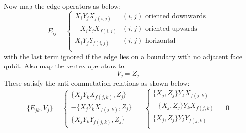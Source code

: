 \documentclass[twoside]{article}
\begin{document}
        Now map the edge operators as below:
        \begin{equation}
                E_{ij} = \begin{cases}
                        X_i Y_j X_{f(i,j)} & (i,j) \text{ oriented downwards}\\
                        -X_i Y_j X_{f(i,j)} & (i,j) \text{ oriented upwards}\\
                        X_i Y_j Y_{f(i,j)} & (i,j) \text{ horizontal}\\
                \end{cases}
        \end{equation}
        with the last term ignored if the edge lies on a boundary with no adjacent face qubit. Also map the vertex operators to:
        \begin{equation}
                V_j = Z_j
        \end{equation}
        These satisfy the anti-commutation relations as shown below:
        \begin{equation}
                \{E_{jk}, V_j\} = \begin{cases} \{ X_j Y_k X_{f(j,k)}, Z_j\}\\
-\{ X_j Y_k X_{f(j,k)}, Z_j\}\\
\{X_j Y_k Y_{f(j,k)}, Z_j \}
\end{cases}= \begin{cases} 
\{X_j, Z_j\}  Y_k X_{f(j,k)}\\
-\{X_j, Z_j\}  Y_k X_{f(j,k)}\\
\{X_j, Z_j\}  Y_k Y_{f(j,k)}\\
\end{cases} = 0
        \end{equation}
\end{document}
